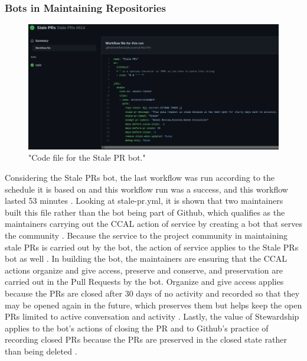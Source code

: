 \subsubsection{Bots in Maintaining Repositories}

\begin{figure}[hbt!]
\begin{center}
\includegraphics[width=.8\textwidth]{./images/actions_pr_bot.png}
\caption{"Code file for the Stale PR bot."}
\vspace{0in}
\end{center}
\end{figure}

Considering the Stale PRs bot, the last workflow was run according to the schedule it is based on and this workflow run was a success, and this workflow lasted 53 minutes \cite{pandasrepo}. Looking at stale-pr.yml, it is shown that two maintainers built this file rather than the bot being part of Github, which qualifies as the maintainers carrying out the CCAL action of service by creating a bot that serves the community \cite{gorman2000values} \cite{rubin2016foundationslis}. Because the service to the project community in maintaining stale PRs is carried out by the bot, the action of service applies to the Stale PRs bot as well \cite{gorman2000values} \cite{rubin2016foundationslis}. In building the bot, the maintainers are ensuring that the CCAL actions organize and give access, preserve and conserve, and preservation are carried out in the Pull Requests by the bot. Organize and give access applies because the PRs are closed after 30 days of no activity and recorded so that they may be opened again in the future, which preserves them but helps keep the open PRs limited to active conversation and activity \cite{gorman2000values} \cite{rubin2016foundationslis} \cite{pandasrepo}. Lastly, the value of Stewardship applies to the bot's actions of closing the PR and to Github's practice of recording closed PRs because the PRs are preserved in the closed state rather than being deleted \cite{gorman2000values}. 

